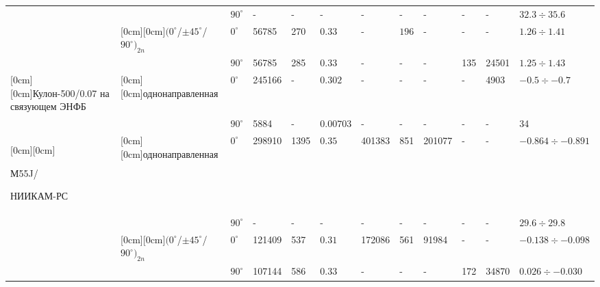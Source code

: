 \begin{table}[h!]
\begin{tabular}[h]{|p{8mm}|p{8mm}|p{6mm}|p{6mm}|p{5mm}|p{8mm}|p{6mm}|p{6mm}|p{8mm}|p{4mm}|p{5mm}|p{20mm}|}
 & & \tiny $90^\circ$&-&-&-&-&-&-&-&-& \tiny $32.3\div35.6$ \\

\cline{2-12}

 & \raisebox{-1.50ex}[0cm][0cm]{\tiny $(0^\circ$/$\pm45^\circ$/$90^\circ)_{2n}$}& \tiny $0^\circ$ & \tiny 56785& \tiny 270& \tiny $0.33$ & -& \tiny $196$& -& -& -& \tiny $1.26\div1.41$ \\

\cline{3-12}

 &  & \tiny $90^\circ$ & \tiny 56785& \tiny 285& \tiny $0.33$ & -& -& -& \tiny 135& \tiny 24501& \tiny $1.25\div1.43$ \\

\hline

\raisebox{-1.50ex}[0cm][0cm]{\tiny Кулон-500/0.07 на связующем ЭНФБ}&

\raisebox{-1.50ex}[0cm][0cm]{\tiny однонаправленная}&

\tiny $0^\circ$ & \tiny 245166& -& \tiny $0.302$ & -& -& -& -& \tiny 4903& \tiny $-0.5\div-0.7$ \\

\cline{3-12}

 &  & \tiny $90^\circ$ & \tiny 5884& -& \tiny $0.00703$ & -& -& -& -& -& \tiny 34 \\

\hline

\raisebox{-4.50ex}[0cm][0cm]{\tiny М55J/ \par НИИКАМ-РС}&

\raisebox{-1.50ex}[0cm][0cm]{\tiny однонаправленная}&

\tiny $0^\circ$ & \tiny 298910& \tiny 1395& \tiny $0.35$& \tiny 401383& \tiny 851& \tiny 201077& -& -& \tiny $-0.864\div-0.891$ \\

\cline{3-12}

 &  & \tiny $90^\circ$ & -& -& -& -& -& -& -& -& \tiny $29.6\div29.8$ \\

\cline{2-12}

 & \raisebox{-1.50ex}[0cm][0cm]{\tiny $(0^\circ$/$\pm45^\circ$/$90^\circ)_{2n}$}&

\tiny $0^\circ$& \tiny 121409& \tiny 537& \tiny $0.31$& \tiny 172086& \tiny 561& \tiny 91984& -& -& \tiny $-0.138\div-0.098$ \\

\cline{3-12}

 &  & \tiny $90^\circ$& \tiny 107144& \tiny 586& \tiny $0.33$ & -& -& -& \tiny 172& \tiny 34870& \tiny $0.026\div-0.030$ \\


\end{tabular}
\end{table}
